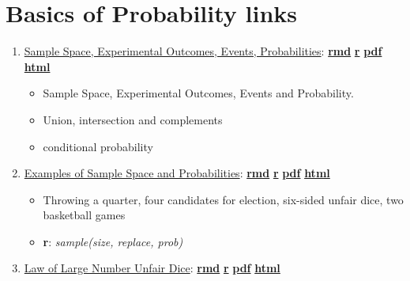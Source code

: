 \documentclass[
]{book}
\providecommand{\tightlist}{%
  \setlength{\itemsep}{0pt}\setlength{\parskip}{0pt}}
\begin{document}
\hypertarget{basics-of-probability-links}{%
\section{Basics of Probability links}\label{basics-of-probability-links}}

\begin{enumerate}
\def\labelenumi{\arabic{enumi}.}
\tightlist
\item
  \href{https://fanwangecon.github.io/Stat4Econ/probability/htmlpdfr/samplespace.html}{Sample Space, Experimental Outcomes, Events, Probabilities}: \href{https://github.com/FanWangEcon/Stat4Econ/blob/master/probability//samplespace.Rmd}{\textbf{rmd}} \textbar{} \href{https://github.com/FanWangEcon/Stat4Econ/blob/master/probability/htmlpdfr/samplespace.R}{\textbf{r}} \textbar{} \href{https://github.com/FanWangEcon/Stat4Econ/blob/master/probability/htmlpdfr/samplespace.pdf}{\textbf{pdf}} \textbar{} \href{https://fanwangecon.github.io/Stat4Econ/probability/htmlpdfr/samplespace.html}{\textbf{html}}

  \begin{itemize}
  \tightlist
  \item
    Sample Space, Experimental Outcomes, Events and Probability.
  \item
    Union, intersection and complements
  \item
    conditional probability
  \end{itemize}
\item
  \href{https://fanwangecon.github.io/Stat4Econ/probability/htmlpdfr/samplespaceexa.html}{Examples of Sample Space and Probabilities}: \href{https://github.com/FanWangEcon/Stat4Econ/blob/master/probability//samplespaceexa.Rmd}{\textbf{rmd}} \textbar{} \href{https://github.com/FanWangEcon/Stat4Econ/blob/master/probability/htmlpdfr/samplespaceexa.R}{\textbf{r}} \textbar{} \href{https://github.com/FanWangEcon/Stat4Econ/blob/master/probability/htmlpdfr/samplespaceexa.pdf}{\textbf{pdf}} \textbar{} \href{https://fanwangecon.github.io/Stat4Econ/probability/htmlpdfr/samplespaceexa.html}{\textbf{html}}

  \begin{itemize}
  \tightlist
  \item
    Throwing a quarter, four candidates for election, six-sided unfair dice, two basketball games
  \item
    \textbf{r}: \emph{sample(size, replace, prob)}
  \end{itemize}
\item
  \href{https://fanwangecon.github.io/Stat4Econ/probability/htmlpdfr/samplespacedice.html}{Law of Large Number Unfair Dice}: \href{https://github.com/FanWangEcon/Stat4Econ/blob/master/probability//samplespacedice.Rmd}{\textbf{rmd}} \textbar{} \href{https://github.com/FanWangEcon/Stat4Econ/blob/master/probability/htmlpdfr/samplespacedice.R}{\textbf{r}} \textbar{} \href{https://github.com/FanWangEcon/Stat4Econ/blob/master/probability/htmlpdfr/samplespacedice.pdf}{\textbf{pdf}} \textbar{} \href{https://fanwangecon.github.io/Stat4Econ/probability/htmlpdfr/samplespacedice.html}{\textbf{html}}


\end{enumerate}
\end{document}
